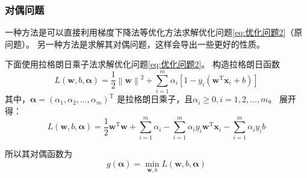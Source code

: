 \documentclass[withoutpreface,bwprint]{NoteBook}
\begin{document}
\subsubsection{对偶问题}
一种方法是可以直接利用梯度下降法等优化方法求解优化问题\cref{eq:优化问题2}（原问题）。
另一种方法是求解其对偶问题，这样会导出一些更好的性质。

下面使用拉格朗日乘子法求解优化问题\cref{eq:优化问题2}。
构造拉格朗日函数
\begin{equation}
    \label{eq:优化问题2的拉格朗日函数}
    L(\mathbf{w},b,\bm{\alpha}) = \frac{1}{2}\left\| \mathbf{w} \right\|^2 + \sum_{i=1}^{m} \alpha_i \left[ 1 - y_i(\mathbf{w}^\mathrm{T} \mathbf{x}_i + b) \right]
\end{equation}
其中，$\bm{\alpha} = (\alpha_1, \alpha_2, \dots, \alpha_m)^\mathrm{T}$ 是拉格朗日乘子，且$\alpha_i \geq 0, i=1,2,\dots,m$。
展开得：
\begin{equation}
    \label{eq:优化问题2的拉格朗日函数展开式}
    L(\mathbf{w},b,\bm{\alpha}) = \frac{1}{2} \mathbf{w}^\mathrm{T}\mathbf{w} + \sum_{i=1}^{m} \alpha_i - \sum_{i=1}^{m} \alpha_i y_i \mathbf{w}^\mathrm{T} \mathbf{x}_i - \sum_{i=1}^{m} \alpha_i y_i b
\end{equation}

所以其对偶函数为
\begin{equation}
    \label{eq:优化问题2的对偶函数}
    g(\bm{\alpha}) = \min_{\mathbf{w},b} L(\mathbf{w},b,\bm{\alpha})
\end{equation}
\end{document}
